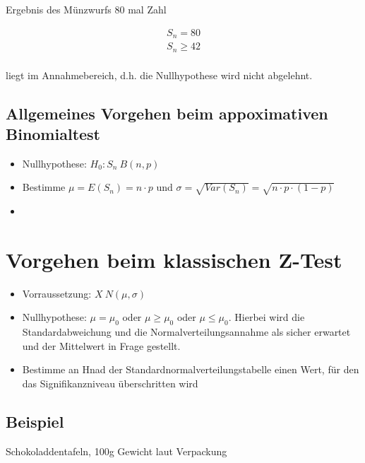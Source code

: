 Ergebnis des Münzwurfs 80 mal Zahl 

\begin{align*}
    S_n = 80 \\
    S_n \geq 42 \\
\end{align*}

liegt im Annahmebereich, d.h. die Nullhypothese wird nicht abgelehnt.

\subsection{Allgemeines Vorgehen beim appoximativen Binomialtest}

\begin{itemize}
    \item Nullhypothese: $H_0: S_n ~ B(n, p)$ 
    \item Bestimme $\mu = E(S_n) = n \cdot p$ und $\sigma = \sqrt{Var(S_n)} = \sqrt{n \cdot p \cdot (1 - p)}$
    \item  
\end{itemize}

\section{Vorgehen beim klassischen Z-Test}

\begin{itemize}
    \item Vorraussetzung: $X ~ N(\mu, \sigma)$
    \item Nullhypothese: $\mu = \mu_0$ oder $\mu \geq \mu_0$ oder $\mu \leq \mu_0$. Hierbei wird die Standardabweichung und die Normalverteilungsannahme als sicher erwartet und der Mittelwert in Frage gestellt.
    \item Bestimme an Hnad der Standardnormalverteilungstabelle einen Wert, für den das Signifikanzniveau überschritten wird
\end{itemize}

\subsection{Beispiel}

Schokoladdentafeln, 100g Gewicht laut Verpackung

